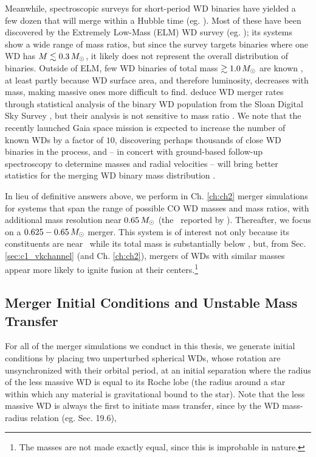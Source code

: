 Meanwhile, spectroscopic surveys for short-period WD binaries have yielded a few dozen that will merge within a Hubble time (eg. \citealt{mars11, gian+15}).  Most of these have been discovered by the Extremely Low-Mass (ELM) WD survey (eg. \citealt{brow+10, gian+15}); its systems show a wide range of mass ratios, but since the survey targets binaries where one WD has $M\lesssim 0.3\,\Msun$, it likely does not represent the overall distribution of binaries.  Outside of ELM, few WD binaries of total mass $\gtrsim1.0\,\Msun$ are known \citep{napi+07, mars11}, at least partly because WD surface area, and therefore luminosity, decreases with mass, making massive ones more difficult to find.  \cite{badem12} deduce WD merger rates through statistical analysis of the binary WD population from the Sloan Digital Sky Survey \citep{york+00}, but their analysis is not sensitive to mass ratio \citep{maozbb12}.  We note that the recently launched Gaia space mission \citep{carr+14} is expected to increase the number of known WDs by a factor of $10$, discovering perhaps thousands of close WD binaries in the process, and -- in concert with ground-based follow-up spectroscopy to determine masses and radial velocities -- will bring better statistics for the merging WD binary mass distribution \citep{gaen+15}.

In lieu of definitive answers above, we perform in Ch. \ref{ch:ch2} merger simulations for systems that span the range of possible CO WD masses and mass ratios, with additional mass resolution near $0.65\,\Msun$ (the \Mmean\ reported by \citealt{tremb09}).  Thereafter, we focus on a $0.625-0.65\,\Msun$ merger.  This system is of interest not only because its constituents are near \Mmean\ while its total mass is substantially below \Mch, but, from Sec. \ref{sec:c1_vkchannel} (and Ch. \ref{ch:ch2}), mergers of WDs with similar masses appear more likely to ignite fusion at their centers.\footnote{The masses are not made exactly equal, since this is improbable in nature.}

\subsection{Merger Initial Conditions and Unstable Mass Transfer}
\label{ssec:c1_stable_mass_transfer}

For all of the merger simulations we conduct in this thesis, we generate initial conditions by placing two unperturbed spherical WDs, whose rotation are unsynchronized with their orbital period, at an initial separation where the radius of the less massive WD is equal to its Roche lobe (the radius around a star within which any material is gravitational bound to the star).  Note that the less massive WD is always the first to initiate mass transfer, since by the WD mass-radius relation (eg. \citealt{kippww12} Sec. 19.6),

